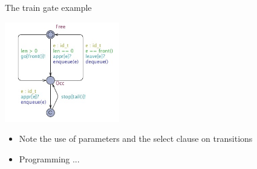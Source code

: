 \documentclass{beamer}
\begin{document}
\begin{slide}{The train gate example}
\small

\begin{center}
\includegraphics[width=5cm]{./images/tg2.jpg} 
\end{center}

\begin{itemize}
\item Note the use of parameters and the select clause on transitions
\item Programming ...
\end{itemize}

\end{slide}

%
%
%
%
%
\end{document}

